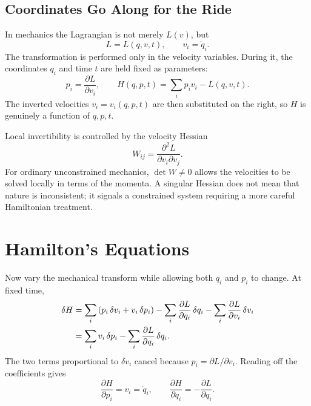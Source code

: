 \subsection{Coordinates Go Along for the Ride}

In mechanics the Lagrangian is not merely \(L(v)\), but
\begin{equation}
 L=L(q,v,t),
 \qquad v_i=\dot q_i.
 \label{eq:l06-L-qvt}
\end{equation}
The transformation is performed only in the velocity variables. During it,
the coordinates \(q_i\) and time \(t\) are held fixed as parameters:
\begin{equation}
 p_i=\frac{\partial L}{\partial v_i},
 \qquad
 H(q,p,t)=\sum_i p_i v_i-L(q,v,t).
 \label{eq:l06-mechanical-transform}
\end{equation}
The inverted velocities \(v_i=v_i(q,p,t)\) are then substituted on the
right, so \(H\) is genuinely a function of \(q,p,t\).

\begin{classroomqa}
\end{classroomqa}

Local invertibility is controlled by the velocity Hessian
\begin{equation}
 W_{ij}=\frac{\partial^2L}{\partial v_i\partial v_j}.
 \label{eq:l06-velocity-hessian}
\end{equation}
For ordinary unconstrained mechanics, \(\det W\neq0\) allows the velocities
to be solved locally in terms of the momenta. A singular Hessian does not mean
that nature is inconsistent; it signals a constrained system requiring a
more careful Hamiltonian treatment.

\section{Hamilton's Equations}

Now vary the mechanical transform while allowing both \(q_i\) and \(p_i\) to
change. At fixed time,
\begin{align}
 \delta H
 &=
 \sum_i\left(p_i\,\delta v_i+v_i\,\delta p_i\right)
 -\sum_i\frac{\partial L}{\partial q_i}\,\delta q_i
 -\sum_i\frac{\partial L}{\partial v_i}\,\delta v_i \notag\\
 &=
 \sum_i v_i\,\delta p_i
 -\sum_i\frac{\partial L}{\partial q_i}\,\delta q_i.
 \label{eq:l06-full-variation}
\end{align}
The two terms proportional to \(\delta v_i\) cancel because
\(p_i=\partial L/\partial v_i\). Reading off the coefficients gives
\begin{equation}
 \frac{\partial H}{\partial p_i}=v_i=\dot q_i,
 \qquad
 \frac{\partial H}{\partial q_i}
 =-\frac{\partial L}{\partial q_i}.
 \label{eq:l06-H-partials}
\end{equation}

